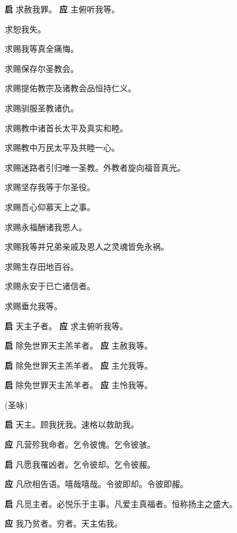 \documentclass[UTF8,17pt]{ctexart}
\begin{document}
\textbf{启} \quad 求赦我罪。 \hfill \textbf{应} \quad 主俯听我等。\phantom{c}

 求恕我失。

 求赐我等真全痛悔。

 求赐保存尔圣教会。

 求赐提佑教宗及诸教会品恒持仁义。

 求赐驯服圣教诸仇。

 求赐教中诸⾸长太平及真实和睦。

 求赐教中万民太平及共睦⼀⼼。

 求赐迷路者引归唯⼀圣教。外教者旋向福⾳真光。

 求赐坚存我等于尔圣役。

 求赐吾⼼仰慕天上之事。

 求赐永福酬诸我恩⼈。

 求赐我等并兄弟亲戚及恩⼈之灵魂皆免永祸。

 求赐⽣存⽥地百⾕。

 求赐永安于已亡诸信者。

 求赐垂允我等。

\textbf{启} \quad 天主⼦者。 \hfill \textbf{应} \quad 求主俯听我等。

\textbf{启} \quad 除免世罪天主羔⽺者。 \hfill \textbf{应} \quad 主赦我等。\phantom{CC}

\textbf{启} \quad 除免世罪天主羔⽺者。 \hfill \textbf{应} \quad 主允我等。\phantom{CC}

\textbf{启} \quad 除免世罪天主羔⽺者。 \hfill \textbf{应} \quad 主怜我等。\phantom{CC}

(圣咏)

\textbf{启} \quad 天主。顾我抚我。速格以救助我。

\textbf{应} \quad 凡营殄我命者。乞令彼愧。乞令彼骇。

\textbf{启} \quad 凡愿我罹凶者。乞令彼却。乞令彼赧。

\textbf{应} \quad 凡欣相告语。嘻哉嘻哉。令彼即却。令彼即赧。

\textbf{启} \quad 凡觅主者。必悦乐于主事。凡爱主真福者。恒称扬主之盛⼤。

\textbf{应} \quad 我乃贫者。穷者。天主佑我。
\end{document}
